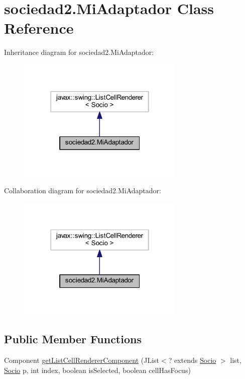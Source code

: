 \hypertarget{classsociedad2_1_1_mi_adaptador}{}\section{sociedad2.\+Mi\+Adaptador Class Reference}
\label{classsociedad2_1_1_mi_adaptador}


Inheritance diagram for sociedad2.\+Mi\+Adaptador\+:\nopagebreak
\begin{figure}[H]
\begin{center}
\leavevmode
\includegraphics[width=226pt]{classsociedad2_1_1_mi_adaptador__inherit__graph}
\end{center}
\end{figure}


Collaboration diagram for sociedad2.\+Mi\+Adaptador\+:\nopagebreak
\begin{figure}[H]
\begin{center}
\leavevmode
\includegraphics[width=226pt]{classsociedad2_1_1_mi_adaptador__coll__graph}
\end{center}
\end{figure}
\subsection*{Public Member Functions}
\begin{DoxyCompactItemize}
\item 
Component \mbox{\hyperlink{classsociedad2_1_1_mi_adaptador_a27def0784983d566dabf88f07bbdd913}{get\+List\+Cell\+Renderer\+Component}} (J\+List$<$? extends \mbox{\hyperlink{classsociedad2_1_1_socio}{Socio}} $>$ list, \mbox{\hyperlink{classsociedad2_1_1_socio}{Socio}} p, int index, boolean is\+Selected, boolean cell\+Has\+Focus)
\end{DoxyCompactItemize}


